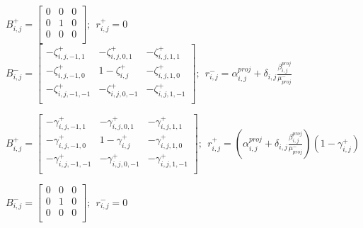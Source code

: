 \documentclass{elsarticle}
\makeatletter
\def\BState{\State\hskip-\ALG@thistlm}
\makeatother
\begin{document}
\begin{algorithm}
\begin{algorithmic}[1]
		\EndIf

		\Else




		\State $B_{i,j}^+=\begin{bmatrix}
				0 & 0 & 0 \\
				0 & 1 & 0 \\
				0 & 0 & 0 \\
			\end{bmatrix};\ \ r^+_{i,j}=0$
		\State $B_{i,j}^-=\begin{bmatrix}
				-\zeta_{i,j,-1,1}^+  & -\zeta_{i,j,0,1}^+  & -\zeta_{i,j,1,1}^+  \\
				-\zeta_{i,j,-1,0}^+  & 1-\zeta^+_{i,j}     & -\zeta_{i,j,1,0}^+  \\
				-\zeta_{i,j,-1,-1}^+ & -\zeta_{i,j,0,-1}^+ & -\zeta_{i,j,1,-1}^+ \\
			\end{bmatrix};\ \ r^-_{i,j}=\alpha_{i,j}^{proj} + \delta_{i,j}\frac{ \beta_{i,j}^{proj}}{\mu_{proj}^-}$
		\Else

		\State  $B_{i,j}^+=\begin{bmatrix}
				-\gamma_{i,j,-1,1}^+  & -\gamma_{i,j,0,1}^+  & -\gamma_{i,j,1,1}^+  \\
				-\gamma_{i,j,-1,0}^+  & 1-\gamma^+_{i,j}     & -\gamma_{i,j,1,0}^+  \\
				-\gamma_{i,j,-1,-1}^+ & -\gamma_{i,j,0,-1}^+ & -\gamma_{i,j,1,-1}^+ \\
			\end{bmatrix};\ \ r^+_{i,j}=(\alpha_{i,j}^{proj} + \delta_{i,j}\frac{ \beta_{i,j}^{proj}}{\mu_{proj}^-}) (1 - \gamma_{i,j}^+)$

		\State $B_{i,j}^-=\begin{bmatrix}
				0 & 0 & 0 \\
				0 & 1 & 0 \\
				0 & 0 & 0 \\
			\end{bmatrix};\ \ r^-_{i,j}=0$

		\EndIf


		\EndIf

		\EndIf

		\EndProcedure
	\end{algorithmic}
\end{algorithm}
\end{document}

